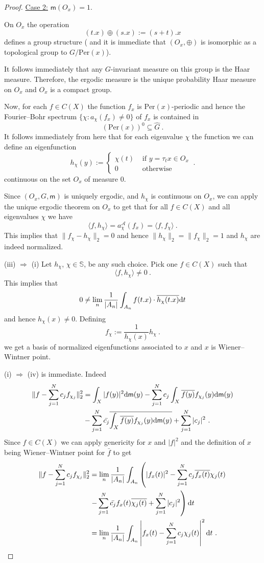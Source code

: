 \documentclass [14pt]{amsart}
\numberwithin{equation}{section}
\newcommand{\Per}{\mbox{Per} }
\newcommand{\cA}{{\mathcal A}}
\newcommand{\mm}{\mathsf{m}}
\newcommand{\dd}{\mbox{\rm d}}
\newcommand{\SSS}{\mathbb S}
\begin{document}
\begin{proof}
\underline{Case 2:} $\mm(O_{x})=1$.

On $O_{x}$ the operation
\[
(t.x) \oplus (s.x) := (s+t).x
\]
defines a group structure ( and it is immediate that $(O_{x}, \oplus)$ is isomorphic as a topological group to $G/\Per(x)$).

It follows immediately that any $G$-invariant measure on this group is the Haar measure. Therefore, the ergodic measure is the unique probability Haar measure on $O_x$ and $O_x$ is a compact group.

Now, for each $f \in C(X)$ the function $f_x$ is $\Per(x)$-periodic and hence the Fourier--Bohr spectrum $\{ \chi : a_\chi(f_x) \neq 0 \}$ of $f_x$ is contained in
\[
(\Per(x))^0 \subseteq \widehat{G} \ .
\]
It follows immediately from here that for each eigenvalue $\chi$ the function we can define an eigenfunction
\[
h_\chi(y):=
\left\{
\begin{array}{cc}
  \chi(t) & \mbox{ if } y =\tau_t x \in O_{x} \\
  0 &\mbox{ otherwise }
\end{array}
\right. \ .
\]
continuous on the set $O_x$ of measure $0$.

Since $(O_x, G, \mm)$ is uniquely ergodic, and $h_\chi$ is continuous on $O_x$, we can apply the unique ergodic theorem on $O_x$ to get that for all $f \in C(X)$ and all eigenvalues $\chi$ we have
\[
\langle f, h_\chi \rangle =a_\chi^\cA(f_x) = \langle f, f_\chi \rangle \ .
\]
This implies that $\| f_\chi-h_\chi \|_2=0$ and hence $\| h_\chi \|_2=\|f_\chi\|_2=1$ and $h_\chi$ are indeed normalized.

\medskip
\noindent (iii) $\Longrightarrow$ (i) Let $h_\chi$, $\chi \in \SSS$,  be any such choice. Pick one $f \in C(X)$ such that
\[
\langle f, h_\chi \rangle \neq 0 \ .
\]
This implies that
\[
0\neq \lim_n \frac{1}{|A_n|} \int_{A_n} f(t.x) \cdot \overline{h_\chi(t.x)} \dd t
\]
and hence $h_\chi(x) \neq 0$.
Defining
\[
f_\chi:= \frac{1}{h_\chi(x)} h_\chi \ .
\]
we get a basis of normalized eigenfunctions associated to $x$ and $x$ is Wiener--Wintner point.


\noindent (i) $\Longrightarrow$ (iv) is immediate. Indeed
\begin{align*}
\| f- \sum_{j=1}^N c_j f_{\chi_j} \|^2_2 &= \int_{X} |f(y)|^2 \dd \mm(y)- \sum_{j=1}^N c_j \int_{X} \overline{ f(y)} f_{\chi_j}(y) \dd \mm(y)\\
&- \sum_{j=1}^N \bar{c_j} \overline{ \int_{X} \overline{ f(y)} f_{\chi_j}(y) \dd \mm(y)} + \sum_{j=1}^N |c_j|^2 \ .
\end{align*}
Since $f\in C(X)$ we can apply genericity for $x$ and $|f|^2$ and the definition of $x$ being Wiener--Wintner point for $\bar{f}$ to get
\begin{align*}
\| f- \sum_{j=1}^N c_j f_{\chi_j} \|^2_2&= \lim_n \frac{1}{|A_n|} \int_{A_n} \left(|f_x(t)|^2 - \sum_{j=1}^N c_j \overline{f_x(t)} \chi_j(t) \right. \\
&\left. -\sum_{j=1}^N \bar{c_j} f_x(t) \overline{\chi_j(t)} + \sum_{j=1}^N |c_j|^2 \right) \dd t\\
&= \lim_n  \frac{1}{|A_n|} \int_{A_n} \left|f_x(t) - \sum_{j=1}^N c_j \chi_j(t)  \right|^2 \dd t \ .
\end{align*}


\end{proof}
\end{document}
